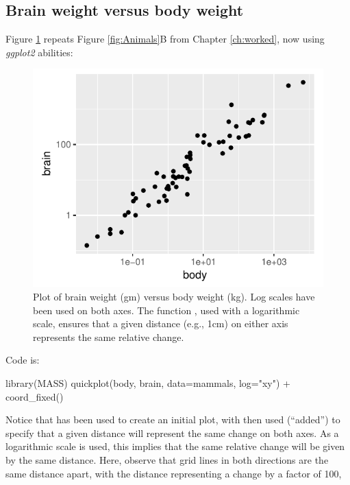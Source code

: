 \subsection*{Brain weight versus body weight}
Figure \ref{fig:ggplot2-brain} repeats Figure \ref{fig:Animals}B from Chapter
\ref{ch:worked}, now using {\em ggplot2} abilities:
\begin{figure}
\begin{Schunk}


\centerline{\includegraphics[width=0.7\linewidth]{figs/09-ggplot2-brain-1} }

\end{Schunk}
\caption{Plot of brain weight (gm) versus body weight (kg).
Log scales have been used on both axes.  The function
, used with a logarithmic scale, ensures
that a given distance (e.g., 1cm) on either axis represents
the same relative change.\label{fig:ggplot2-brain}}
\end{figure}

\noindent Code is:
\begin{Schunk}
\begin{Sinput}
library(MASS)
quickplot(body, brain, data=mammals, log="xy") +
  coord_fixed()
\end{Sinput}
\end{Schunk}
  Notice
that  has been used to create an initial plot, with
 then used (``added'') to specify that a given
distance will represent the same change on both axes.  As a
logarithmic scale is used, this implies that the same relative change
will be given by the same distance.  Here, observe that grid lines in
both directions are the same distance apart, with the distance
representing a change by a factor of 100,

